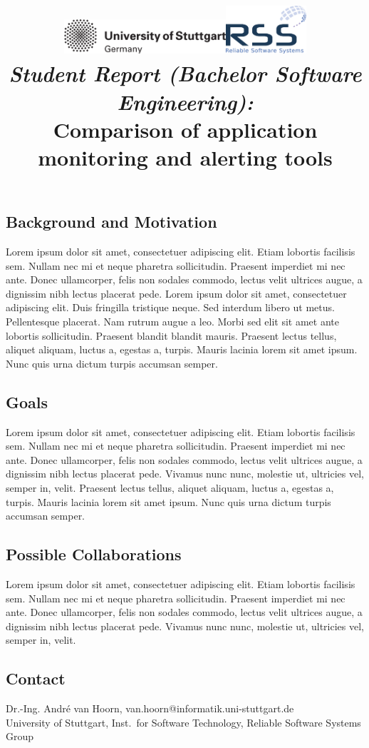 \documentclass[a4paper,12pt]{article}
\date{}
\title{
\includegraphics[width=6cm]{figures/stuttgart-vector.pdf}\hfill{\includegraphics[width=3cm]{figures/rss_logo.pdf}}
\quad \\ [0.5cm]
{\large \textit{Student Report (Bachelor Software Engineering):}} \\ [1mm]
{\Large Comparison of application monitoring and alerting tools}
}
\begin{document}
	

\maketitle

\thispagestyle{empty}

\vspace{-2.5cm}


\subsection*{Background and Motivation}
Lorem ipsum dolor sit amet, consectetuer adipiscing elit. Etiam lobortis facilisis sem. Nullam nec
mi et neque pharetra sollicitudin. Praesent imperdiet mi nec ante. Donec ullamcorper, felis non
sodales commodo, lectus velit ultrices augue, a dignissim nibh lectus placerat pede. \cite{newman2015building} 
Lorem ipsum dolor sit amet, consectetuer adipiscing elit. Duis fringilla tristique neque. Sed interdum libero ut metus.
Pellentesque placerat. Nam rutrum augue a leo. Morbi sed elit sit amet ante lobortis sollicitudin.
Praesent blandit blandit mauris. Praesent lectus tellus, aliquet aliquam, luctus a, egestas a, turpis.
Mauris lacinia lorem sit amet ipsum. Nunc quis urna dictum turpis accumsan semper.


\subsection*{Goals}
Lorem ipsum dolor sit amet, consectetuer adipiscing elit. Etiam lobortis facilisis sem. Nullam nec
mi et neque pharetra sollicitudin. Praesent imperdiet mi nec ante. Donec ullamcorper, felis non
sodales commodo, lectus velit ultrices augue, a dignissim nibh lectus placerat pede. Vivamus nunc
nunc, molestie ut, ultricies vel, semper in, velit. \cite{bass2015devops} 
Praesent lectus tellus, aliquet aliquam, luctus a, egestas a, turpis.
Mauris lacinia lorem sit amet ipsum. Nunc quis urna dictum turpis accumsan semper.


\subsection*{Possible Collaborations}
Lorem ipsum dolor sit amet, consectetuer adipiscing elit. Etiam lobortis facilisis sem. Nullam nec
mi et neque pharetra sollicitudin. Praesent imperdiet mi nec ante. Donec ullamcorper, felis non
sodales commodo, lectus velit ultrices augue, a dignissim nibh lectus placerat pede. Vivamus nunc
nunc, molestie ut, ultricies vel, semper in, velit. \cite{pitakrat2016archaware}

\begin{scriptsize}


\end{scriptsize}

\subsection*{Contact}
Dr.-Ing. André van Hoorn, van.hoorn@informatik.uni-stuttgart.de \\
University of Stuttgart, Inst.\ for Software Technology, Reliable Software Systems Group \\
\end{document}
